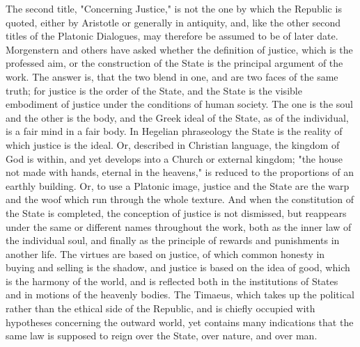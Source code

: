 The second title, "Concerning Justice," is not the one by which the Republic is quoted, either by Aristotle or generally in antiquity, and, like the other second titles of the Platonic Dialogues, may therefore be assumed to be of later date. Morgenstern and others have asked whether the definition of justice, which is the professed aim, or the construction of the State is the principal argument of the work. The answer is, that the two blend in one, and are two faces of the same truth; for justice is the order of the State, and the State is the visible embodiment of justice under the conditions of human society. The one is the soul and the other is the body, and the Greek ideal of the State, as of the individual, is a fair mind in a fair body. In Hegelian phraseology the State is the reality of which justice is the ideal. Or, described in Christian language, the kingdom of God is within, and yet develops into a Church or external kingdom; "the house not made with hands, eternal in the heavens," is reduced to the proportions of an earthly building. Or, to use a Platonic image, justice and the State are the warp and the woof which run through the whole texture. And when the constitution of the State is completed, the conception of justice is not dismissed, but reappears under the same or different names throughout the work, both as the inner law of the individual soul, and finally as the principle of rewards and punishments in another life. The virtues are based on justice, of which common honesty in buying and selling is the shadow, and justice is based on the idea of good, which is the harmony of the world, and is reflected both in the institutions of States and in motions of the heavenly bodies. The Timaeus, which takes up the political rather than the ethical side of the Republic, and is chiefly occupied with hypotheses concerning the outward world, yet contains many indications that the same law is supposed to reign over the State, over nature, and over man.

